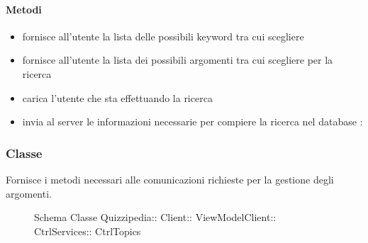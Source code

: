 \paragraph{Metodi}
\begin{itemize}
\item {}
\newline
fornisce all'utente la lista delle possibili keyword tra cui scegliere
\newline
\item {}
\newline
fornisce all'utente la lista dei possibili argomenti tra cui scegliere per la ricerca
\newline
\item {}
\newline
carica l'utente che sta effettuando la ricerca
\newline
\item {}
\newline
invia al server le informazioni necessarie per compiere la ricerca nel database
\newline
{} :
\end{itemize}
\subsubsection{Classe }
Fornisce i metodi necessari alle comunicazioni richieste per la gestione degli argomenti.
\begin{figure}[H]
\centering
\noindent{}
\caption[Schema Classe CtrlTopics]{Schema Classe Quizzipedia:: Client:: ViewModelClient:: CtrlServices:: CtrlTopics}
\end{figure}
